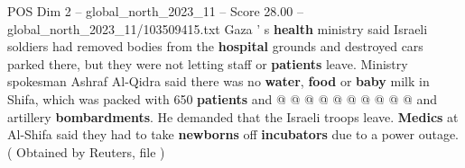 \begin{textsample}{POS Dim 2 – global\_north\_2023\_11 – Score 28.00 – global\_north\_2023\_11/103509415.txt}
Gaza ' s \textbf{health} ministry said Israeli soldiers had removed bodies from the \textbf{hospital} grounds and destroyed cars parked there, but they were not letting staff or \textbf{patients} leave.
Ministry spokesman Ashraf Al-Qidra said there was no \textbf{water}, \textbf{food} or \textbf{baby} milk in Shifa, which was packed with 650 \textbf{patients} and @ @ @ @ @ @ @ @ @ @ and artillery \textbf{bombardments}.
He demanded that the Israeli troops leave. \textbf{Medics} at Al-Shifa said they had to take \textbf{newborns} off \textbf{incubators} due to a power outage. ( Obtained by Reuters, file )

\end{textsample}
